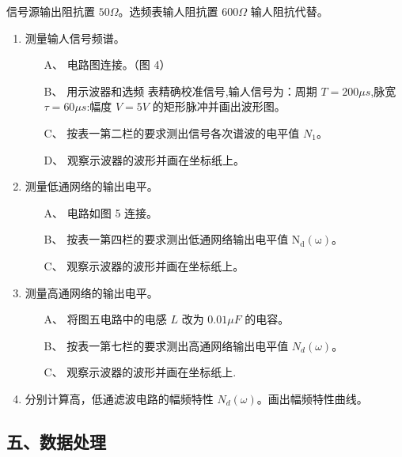 \documentclass[dvipsnames, svgnames,a4paper,11pt]{article}
\begin{document}
信号源输出阻抗置 $50\Omega$。选频表输人阻抗置 $600\Omega$ 输人阻抗代替。

\begin{figure}[htbp]
	\centering
	\caption{}
\end{figure}

\begin{enumerate}
	\item 测量输人信号频谱。
	\begin{enumerate}
    \item[A、] 电路图连接。（图 4）
    \item[B、] 用示波器和选频 表精确校准信号,输人信号为：周期 $T = 200\mu s$,脉宽 $\tau =60 \mu s$:幅度 $V=5V$ 的矩形脉冲并画出波形图。
    \item[C、] 按表一第二栏的要求测出信号各次谱波的电平值 $N_1$。
    \item[D、] 观察示波器的波形并画在坐标纸上。
  \end{enumerate}
	\item 测量低通网络的输出电平。
	  \begin{enumerate}
      \item[A、] 电路如图 5 连接。
      \item[B、] 按表一第四栏的要求测出低通网络输出电平值 $\mathrm{N_d(\omega)}$。
      \item[C、] 观察示波器的波形并画在坐标纸上。
    \end{enumerate}
  \item 测量高通网络的输出电平。
    \begin{enumerate}
      \item[A、] 将图五电路中的电感 $L$ 改为 $0.01\mu F$ 的电容。
      \item[B、] 按表一第七栏的要求测出高通网络输出电平值 $N_d(\omega)$。
      \item[C、] 观察示波器的波形并画在坐标纸上.
    \end{enumerate}
  \item 分别计算高，低通滤波电路的幅频特性 $N_d(\omega)$。画出幅频特性曲线。
\end{enumerate}

\begin{figure}[htbp]
	\centering
	\caption{}
\end{figure}

\subsection*{五、数据处理}
\end{document}
